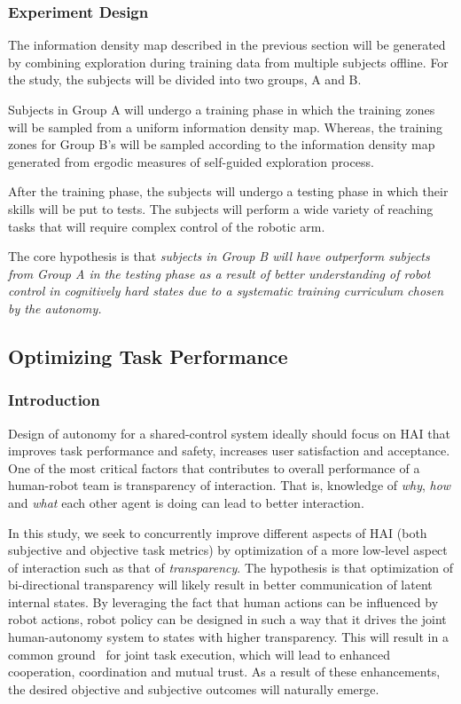 \documentclass[12pt]{article}
\begin{document}
\subsubsection{Experiment Design}
The information density map described in the previous section will be generated by combining exploration during training data from multiple subjects offline. For the study, the subjects will be divided into two groups, A and B. 

Subjects in Group A will undergo a training phase in which the training zones will be sampled from a uniform information density map. Whereas, the training zones for Group B's will be sampled according to the information density map generated from ergodic measures of self-guided exploration process. 

After the training phase, the subjects will undergo a testing phase in which their skills will be put to tests. The subjects will perform a wide variety of reaching tasks that will require complex control of the robotic arm. 

The core hypothesis is that \textit{subjects in Group B will have outperform subjects from Group A in the testing phase as a result of better understanding of robot control in cognitively hard states due to a systematic training curriculum chosen by the autonomy.}

\subsection{Optimizing Task Performance}\label{study:rq3}

\subsubsection{Introduction}
Design of autonomy for a shared-control system ideally should focus on HAI that improves task performance and safety, increases user satisfaction and acceptance. One of the most critical factors that contributes to overall performance of a human-robot team is transparency of interaction. That is, knowledge of \textit{why}, \textit{how} and \textit{what} each other agent is doing can lead to better interaction. 

In this study, we seek to concurrently improve
different aspects of HAI (both subjective and objective task metrics) by optimization of a more low-level aspect of interaction such as that of  \textit{transparency}. The hypothesis is that optimization of bi-directional transparency will likely result in better communication of latent internal states. By leveraging the fact that human actions can be influenced by robot actions, robot policy can be designed in such a way that it drives the joint human-autonomy system to states with higher transparency. This will result in a common ground~\cite{kiesler2005fostering} for joint task execution, which will lead to enhanced cooperation, coordination and mutual trust. As a result of these enhancements, the desired objective and subjective outcomes will naturally emerge.
\end{document}
